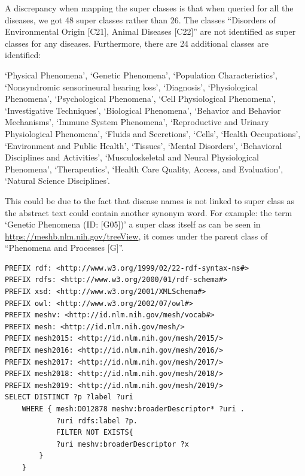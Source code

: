 A discrepancy when mapping the super classes is that when queried for all the diseases, we got 48 super classes rather than 26. The classes ``Disorders of Environmental Origin [C21], Animal Diseases [C22]'' are not identified as super classes for any diseases. Furthermore, there are 24 additional classes are identified:
\begin{spverbatim}
`Physical Phenomena', `Genetic Phenomena', `Population Characteristics', `Nonsyndromic sensorineural hearing loss', `Diagnosis', `Physiological Phenomena', `Psychological Phenomena', `Cell Physiological Phenomena', `Investigative Techniques', `Biological Phenomena', `Behavior and Behavior Mechanisms', `Immune System Phenomena', `Reproductive and Urinary Physiological Phenomena', `Fluids and Secretions', `Cells', `Health Occupations', `Environment and Public Health', `Tissues', `Mental Disorders', `Behavioral Disciplines and Activities', `Musculoskeletal and Neural Physiological Phenomena', `Therapeutics', `Health Care Quality, Access, and Evaluation', `Natural Science Disciplines'. 
\end{spverbatim}
This could be due to the fact that disease names is not linked to super class as the abstract text could contain another synonym word. 
For example: the term `Genetic Phenomena (ID: [G05])' a super class itself as can be seen in \url{https://meshb.nlm.nih.gov/treeView}, it comes under the parent class of ``Phenomena and Processes [G]''. 

\begin{lstlisting}[caption = SPARQL query to map disease names to their respective super classes, label = superclassquery]
PREFIX rdf: <http://www.w3.org/1999/02/22-rdf-syntax-ns#>
PREFIX rdfs: <http://www.w3.org/2000/01/rdf-schema#>
PREFIX xsd: <http://www.w3.org/2001/XMLSchema#>
PREFIX owl: <http://www.w3.org/2002/07/owl#>
PREFIX meshv: <http://id.nlm.nih.gov/mesh/vocab#>
PREFIX mesh: <http://id.nlm.nih.gov/mesh/>
PREFIX mesh2015: <http://id.nlm.nih.gov/mesh/2015/>
PREFIX mesh2016: <http://id.nlm.nih.gov/mesh/2016/>
PREFIX mesh2017: <http://id.nlm.nih.gov/mesh/2017/>
PREFIX mesh2018: <http://id.nlm.nih.gov/mesh/2018/>
PREFIX mesh2019: <http://id.nlm.nih.gov/mesh/2019/>
SELECT DISTINCT ?p ?label ?uri 
    WHERE { mesh:D012878 meshv:broaderDescriptor* ?uri .
            ?uri rdfs:label ?p.
            FILTER NOT EXISTS{
            ?uri meshv:broaderDescriptor ?x
        }
    }
\end{lstlisting}

